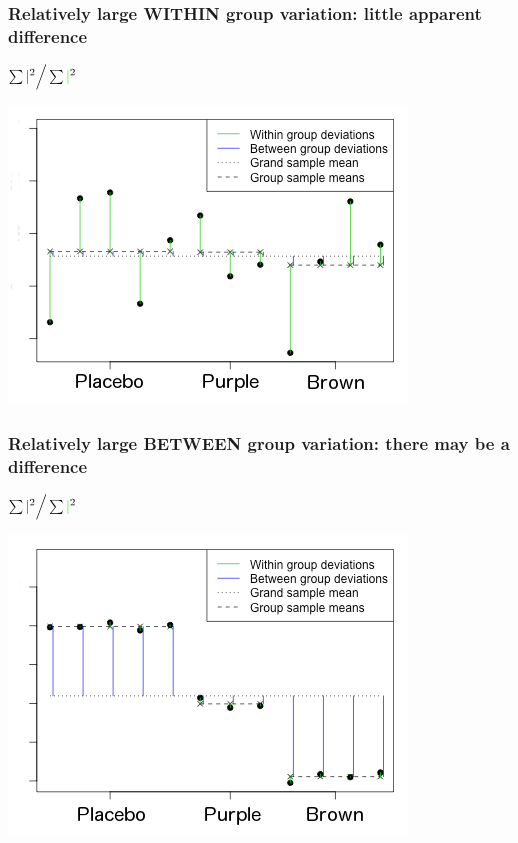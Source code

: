 \documentclass[slidestop,compress,mathserif,12pt,t,professionalfonts,xcolor=table]{beamer}
\begin{document}
\begin{frame}
\frametitle{Relatively large WITHIN group variation: little apparent difference}

\centering
\(
\sum {\color{blue} \mid}^2 \Big/ \sum {\color{green} \mid}^2
\)

    \includegraphics[scale=0.6]{Figures/anova-lots-of-within-group-jelly-bean.png}

\end{frame}

\begin{frame}
\frametitle{Relatively large BETWEEN group variation: there may be a difference}

\centering
\(
\sum {\color{blue} \mid}^2 \Big/ \sum {\color{green} \mid}^2
\)
    
    \includegraphics[scale=0.6]{Figures/anova-lots-of-between-group-jelly-bean.png}

\end{frame}
\end{document}
